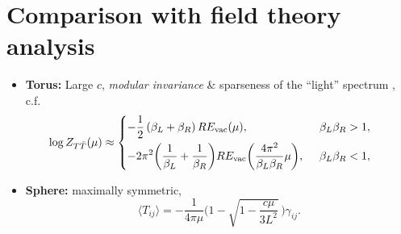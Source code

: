 \documentclass[10pt]{article}
\renewenvironment{frame}[1]%
	{\section*{#1}}%
	{\clearpage}
\begin{document}
\begin{frame}{Comparison with field theory analysis}{%
	\textcite{Datta:2018thy,Apolo:2023aho}
}

\vspace{-.3\baselineskip}

\begin{itemize}
\item \textbf{Torus:} Large $c$, \textit{modular invariance} \& sparseness of the ``light'' spectrum \cite{Datta:2018thy,Apolo:2023aho},
	c.f. \textcite{Hartman:2014oaa}
	\begin{equation*}
	\hspace{-1.5em}
		\log   Z_{T\bar T}(\mu)  \approx \left\{ \begin{aligned}
		& {-\frac{1}{2}}\,(\beta_L + \beta_R)\, RE_{\text{vac}}(\mu),  &\beta_L \beta_R > 1, \\
		& {-2 \pi^2 \bigg(\frac{1}{\beta_L} + \frac{1}{\beta_R}\bigg)  RE_{\text{vac}}\bigg(\frac{4\pi^2}{\beta_L \beta_R} \mu \bigg)}, \ \, &\beta_L\beta_R < 1, %
		 \end{aligned} \right. %
	\end{equation*}
	
\item \textbf{Sphere:} maximally symmetric, \textcite{Donnelly:2018bef}
	\begin{equation}
		\langle T_{ij}\rangle =-\frac{1}{4\pi\mu} \bigg(1-\sqrt{1-\frac{c\mu}{3L^2}}\, \bigg)  \gamma_{ij}.
	\end{equation}
\end{itemize}
\end{frame}
\end{document}
